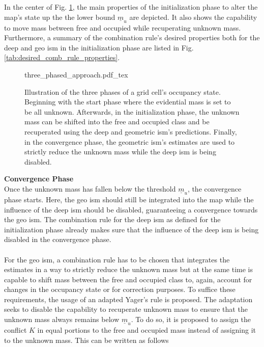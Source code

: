 In the center of Fig. \ref{fig:three_phased_approach}, the main properties of the initialization phase to alter the map's state up the the lower bound $\underline{m}_{u}$ are depicted. It also shows the capability to move mass between free and occupied while recuperating unknown mass. Furthermore, a summary of the combination rule's desired properties both for the deep and geo \gls{ism} in the initialization phase are listed in Fig. \ref{tab:desired_comb_rule_properties}.
\begin{figure}[H]
	\begin{center}
		{three_phased_approach.pdf_tex}
		\caption{\label{fig:three_phased_approach}Illustration of the three phases of a grid cell's occupancy state. Beginning with the start phase where the evidential mass is set to be all unknown. Afterwards, in the initialization phase, the unknown mass can be shifted into the free and occupied class and be recuperated using the deep and geometric \gls{ism}'s predictions. Finally, in the convergence phase, the geometric \gls{ism}'s estimates are used to strictly reduce the unknown mass while the deep \gls{ism} is being disabled.}
	\end{center}
\end{figure} 
\textbf{Convergence Phase}\\
Once the unknown mass has fallen below the threshold $\underline{m}_u$, the convergence phase starts. Here, the geo \gls{ism} should still be integrated into the map while the influence of the deep \gls{ism} should be disabled, guaranteeing a convergence towards the geo \gls{ism}. The combination rule for the deep \gls{ism} as defined for the initialization phase already makes sure that the influence of the deep \gls{ism} is being disabled in the convergence phase. 
\\\\
For the geo \gls{ism}, a combination rule has to be chosen that integrates the estimates in a way to strictly reduce the unknown mass but at the same time is capable to shift mass between the free and occupied class to, again, account for changes in the occupancy state or for correction purposes. To suffice these requirements, the usage of an adapted Yager's rule is proposed. The adaptation seeks to disable the capability to recuperate unknown mass to ensure that the unknown mass always remains below $\underline{m}_{u}$. To do so, it is proposed to assign the conflict $K$ in equal portions to the free and occupied mass instead of assigning it to the unknown mass. This can be written as follows

